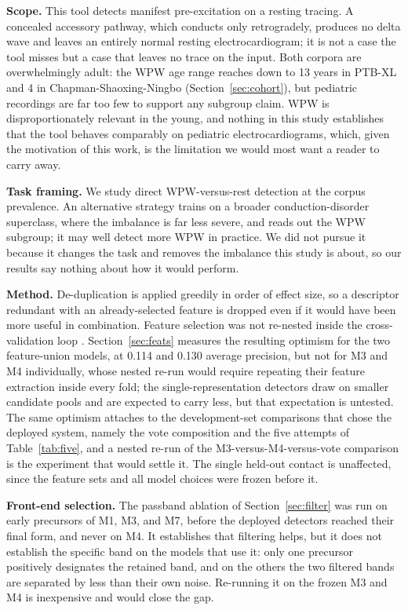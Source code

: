 \documentclass[11pt]{article}
\begin{document}
\textbf{Scope.} This tool detects manifest pre-excitation on a resting tracing. A concealed accessory pathway, which conducts only retrogradely, produces no delta wave and leaves an entirely normal resting electrocardiogram; it is not a case the tool misses but a case that leaves no trace on the input. Both corpora are overwhelmingly adult: the WPW age range reaches down to 13 years in PTB-XL and 4 in Chapman-Shaoxing-Ningbo (Section~\ref{sec:cohort}), but pediatric recordings are far too few to support any subgroup claim. WPW is disproportionately relevant in the young, and nothing in this study establishes that the tool behaves comparably on pediatric electrocardiograms, which, given the motivation of this work, is the limitation we would most want a reader to carry away.

\textbf{Task framing.} We study direct WPW-versus-rest detection at the corpus prevalence. An alternative strategy trains on a broader conduction-disorder superclass, where the imbalance is far less severe, and reads out the WPW subgroup; it may well detect more WPW in practice. We did not pursue it because it changes the task and removes the imbalance this study is about, so our results say nothing about how it would perform.

\textbf{Method.} De-duplication is applied greedily in order of effect size, so a descriptor redundant with an already-selected feature is dropped even if it would have been more useful in combination. Feature selection was not re-nested inside the cross-validation loop \cite{cawley}. Section~\ref{sec:feats} measures the resulting optimism for the two feature-union models, at 0.114 and 0.130 average precision, but not for M3 and M4 individually, whose nested re-run would require repeating their feature extraction inside every fold; the single-representation detectors draw on smaller candidate pools and are expected to carry less, but that expectation is untested. The same optimism attaches to the development-set comparisons that chose the deployed system, namely the vote composition and the five attempts of Table~\ref{tab:five}, and a nested re-run of the M3-versus-M4-versus-vote comparison is the experiment that would settle it. The single held-out contact is unaffected, since the feature sets and all model choices were frozen before it.

\textbf{Front-end selection.} The passband ablation of Section~\ref{sec:filter} was run on early precursors of M1, M3, and M7, before the deployed detectors reached their final form, and never on M4. It establishes that filtering helps, but it does not establish the specific band on the models that use it: only one precursor positively designates the retained band, and on the others the two filtered bands are separated by less than their own noise. Re-running it on the frozen M3 and M4 is inexpensive and would close the gap.
\end{document}
